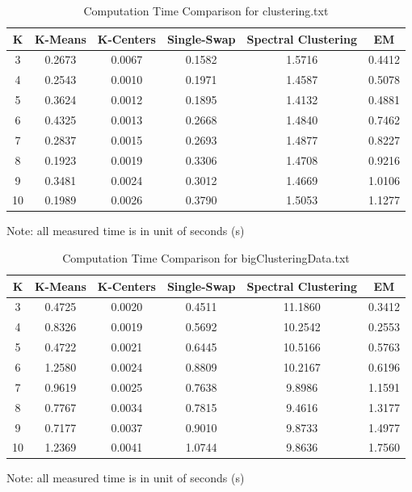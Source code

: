 \begin{table}[H]
	\centering
	\caption{Computation Time Comparison for clustering.txt}
	\label{table:time_clustering}	
	\begin{tabular}{ c | c | c | c | c | c }
		\hline \hline
		K  	&	K-Means    & K-Centers    & Single-Swap    & Spectral Clustering    & EM \\[0.1cm]
		\hline
		3	   &	0.2673     & 0.0067   & 0.1582    & 1.5716    & 0.4412 \\[0.1cm]
		4    &	0.2543     & 0.0010   & 0.1971    & 1.4587    & 0.5078 \\[0.1cm]
		5    &	0.3624     & 0.0012   & 0.1895    & 1.4132    & 0.4881 \\[0.1cm]
		6    &	0.4325     & 0.0013   & 0.2668    & 1.4840    & 0.7462 \\[0.1cm]
		7    &	0.2837     & 0.0015   & 0.2693    & 1.4877    & 0.8227 \\[0.1cm]
		8    &	0.1923     & 0.0019   & 0.3306    & 1.4708    & 0.9216 \\[0.1cm]
		9    &	0.3481     & 0.0024   & 0.3012    & 1.4669    & 1.0106 \\[0.1cm]
		10  &	0.1989     & 0.0026   & 0.3790    & 1.5053    & 1.1277 \\[0.1cm]
		\hline	
	\end{tabular}
\end{table}
{\centering Note: all measured time is in unit of seconds (s)}

\begin{table}[H]
	\centering
	\caption{Computation Time Comparison for bigClusteringData.txt}
	\label{table:time_bigClustering}	
	\begin{tabular}{ c | c | c | c | c | c }
		\hline \hline
		K  	&	K-Means     & K-Centers    & Single-Swap    & Spectral Clustering    & EM \\[0.1cm]
		\hline
		3	   &	0.4725     & 0.0020   & 0.4511    & 11.1860    & 0.3412 \\[0.1cm]
		4    &	0.8326     & 0.0019   & 0.5692    & 10.2542    & 0.2553 \\[0.1cm]
		5    &	0.4722     & 0.0021   & 0.6445    & 10.5166    & 0.5763 \\[0.1cm]
		6    &	1.2580     & 0.0024   & 0.8809    & 10.2167    & 0.6196 \\[0.1cm]
		7    &	0.9619     & 0.0025   & 0.7638    & 9.8986      & 1.1591 \\[0.1cm]
		8    &	0.7767     & 0.0034   & 0.7815    & 9.4616      & 1.3177 \\[0.1cm]
		9    &	0.7177     & 0.0037   & 0.9010    & 9.8733      & 1.4977 \\[0.1cm]
		10    &	1.2369     & 0.0041   & 1.0744    & 9.8636      & 1.7560 \\[0.1cm]
		\hline	
	\end{tabular}
\end{table}
{\centering Note: all measured time is in unit of seconds (s)}

